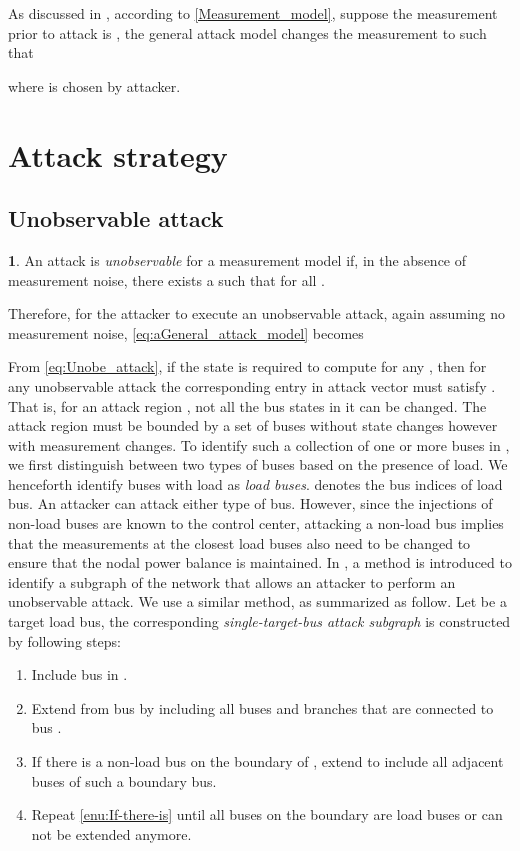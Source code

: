 \documentclass[twocolumn,english,final,journal]{IEEEtran}
\theoremstyle{plain}
\theoremstyle{definition}
\newtheorem{defn}[thm]{\protect\definitionname}
\providecommand{\definitionname}{Definition}
\begin{document}
As discussed in , according to \eqref{Measurement_model}, suppose the  measurement prior to attack is , the general attack model changes the  measurement  to  such that

where  is chosen by attacker.


\section{Attack strategy\label{sec:Attack-strategy}}


\subsection{Unobservable attack \label{sub:Unobservable-attack}}
\begin{defn}
An attack is \emph{unobservable} for a measurement model 
if, in the absence of measurement noise, there exists a 
such that  for all .

Therefore, for the attacker to execute an unobservable attack, again
assuming no measurement noise, \eqref{eq:aGeneral_attack_model} becomes


\end{defn}
From \eqref{eq:Unobe_attack}, if the  state 
is required to compute  for any ,
then for any unobservable attack the corresponding 
entry in attack vector must satisfy . That is, for an attack
region , not all the bus states
in it can be changed. The attack region must be bounded by a set of
buses without state changes however with measurement changes. To identify
such a collection of one or more buses in , we first
distinguish between two types of buses based on the presence of load.
We henceforth identify buses with load as \emph{load buses}. 
denotes the bus indices of load bus. An attacker can attack either
type of bus. However, since the injections of non-load buses are known
to the control center, attacking a non-load bus implies that the measurements
at the closest load buses also need to be changed to ensure that the
nodal power balance is maintained. In , a method is
introduced to identify a subgraph of the network that allows an attacker
to perform an unobservable attack. We use a similar method, as summarized
as follow. Let  be a target load bus, the corresponding \emph{single-target-bus
attack subgraph}  is constructed by following steps:
\begin{enumerate}
\item Include bus  in . 
\item Extend  from bus  by including all buses and
branches that are connected to bus .
\item \label{enu:If-there-is}If there is a non-load bus on the boundary
of , extend  to include all adjacent
buses of such a boundary bus.
\item Repeat \eqref{enu:If-there-is} until all buses on the boundary are
load buses or  can not be extended anymore.
\end{enumerate}
\end{document}
